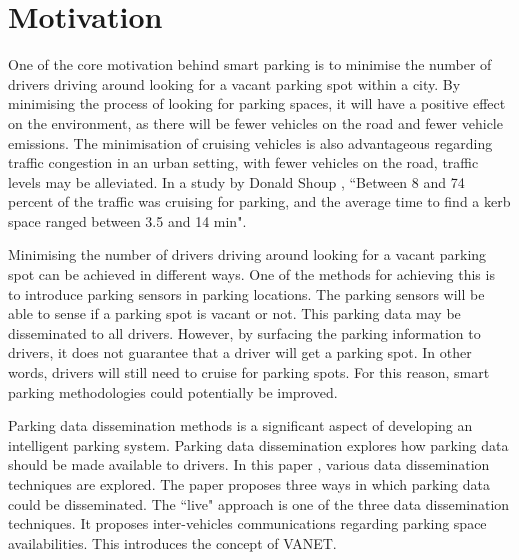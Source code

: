 \section{Motivation}\label{s:motivation}
One of the core motivation behind smart parking is to minimise the number of drivers driving around looking for a vacant parking spot within a city. By minimising the process of looking for parking spaces, it will have a positive effect on the environment, as there will be fewer vehicles on the road and fewer vehicle emissions. The minimisation of cruising vehicles is also advantageous regarding traffic congestion in an urban setting, with fewer vehicles on the road, traffic levels may be alleviated. In a study by Donald Shoup \citep{Shoup2006CruisingParking}, ``Between 8 and 74 percent of the traffic was cruising for parking, and the average time to find a kerb space ranged between 3.5 and 14 min".

Minimising the number of drivers driving around looking for a vacant parking spot can be achieved in different ways. One of the methods for achieving this is to introduce parking sensors in parking locations. The parking sensors will be able to sense if a parking spot is vacant or not. This parking data may be disseminated to all drivers. However, by surfacing the parking information to drivers, it does not guarantee that a driver will get a parking spot. In other words, drivers will still need to cruise for parking spots. For this reason, smart parking methodologies could potentially be improved.

Parking data dissemination methods is a significant aspect of developing an intelligent parking system. Parking data dissemination explores how parking data should be made available to drivers. In this paper \citep{Verroios2011ReachingNetworking}, various data dissemination techniques are explored. The paper proposes three ways in which parking data could be disseminated. The ``live" approach is one of the three data dissemination techniques. It proposes inter-vehicles communications regarding parking space availabilities. This introduces the concept of \ac{VANET}.

